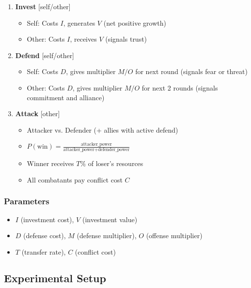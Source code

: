 \begin{enumerate}
    \item \textbf{Invest} [self/other]
    \begin{itemize}
        \item Self: Costs $I$, generates $V$ (net positive growth)
        \item Other: Costs $I$, receives $V$ (signals trust)
    \end{itemize}

    \item \textbf{Defend} [self/other]
    \begin{itemize}
        \item Self: Costs $D$, gives multiplier $M/O$ for next round (signals fear or threat)
        \item Other: Costs $D$, gives multiplier $M/O$ for next 2 rounds (signals commitment and alliance)
    \end{itemize}

    \item \textbf{Attack} [other]
    \begin{itemize}
        \item Attacker vs. Defender (+ allies with active defend)
        \item $P(\text{win}) = \frac{\text{attacker\_power}}{\text{attacker\_power} + \text{defender\_power}}$
        \item Winner receives $T\%$ of loser's resources
        \item All combatants pay conflict cost $C$
    \end{itemize}
\end{enumerate}

\subsubsection{Parameters}

\begin{itemize}
    \item $I$ (investment cost), $V$ (investment value)
    \item $D$ (defense cost), $M$ (defense multiplier), $O$ (offense multiplier)
    \item $T$ (transfer rate), $C$ (conflict cost)
\end{itemize}

\subsection{Experimental Setup}

